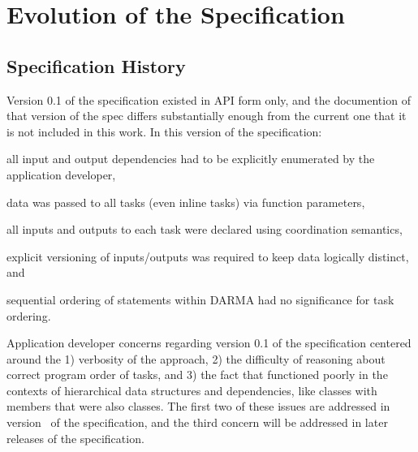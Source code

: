 
\chapter{Evolution of the Specification}
\label{chap:evolution}
\section{Specification History}
\label{sec:past}
Version 0.1 of the specification existed in \gls{API} form only, and
the documention of that version of the spec differs substantially
enough from the current one that it is not included in this work.
In this version of the specification:
\begin{compactenum}
\item all input and output dependencies had to be explicitly enumerated by the application
developer,
\item data was passed to all tasks (even inline tasks) via function parameters,
\item all inputs and outputs to each task were declared using \gls{coordination semantics},
\item explicit versioning of inputs/outputs was required to keep data
logically distinct, and
\item sequential ordering of statements within DARMA had no significance for task ordering.
\end{compactenum}

 Application developer concerns regarding version 0.1 of the specification
 centered around the 1) verbosity of the approach, 2) the difficulty of
 reasoning about correct program order of tasks, and 3) the fact that 
  functioned poorly in the contexts of hierarchical data
 structures and dependencies, like classes with members that were also
 classes.  The first two of these issues are addressed in version \specVersion\ of the
 specification, and the third concern will be addressed in later releases of the specification.


